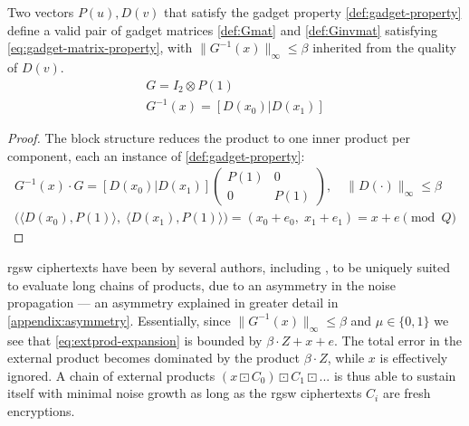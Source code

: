 \vspace{1pt}

\begin{lemma}
    \label{lemma:gadget-matrix-construction}
    Two vectors $P(u), D(v)$ that satisfy the gadget property \eqref{def:gadget-property} define a valid pair of gadget matrices \eqref{def:Gmat} and \eqref{def:Ginvmat} satisfying \eqref{eq:gadget-matrix-property}, with $\|G^{-1}(x)\|_\infty \leq \beta$ inherited from the quality of $D(v)$.
    \begin{gather}
        \label{def:Gmat}
        G = I_2 \otimes P(1) \\
        \label{def:Ginvmat}
        G^{-1}(x) = [D(x_0)|D(x_1)]
    \end{gather}

    \begin{proof}
        The block structure reduces the product to one inner product per component, each an instance of \eqref{def:gadget-property}:
        \begin{gather*}
            G^{-1}(x)\cdot G = [D(x_0)|D(x_1)]
            \begin{pmatrix}
                P(1) & 0 \\
                0 & P(1)
            \end{pmatrix}, \quad \|D(\cdot)\|_\infty \leq \beta \\
            \big(\langle D(x_0), P(1)\rangle,\; \langle D(x_1), P(1)\rangle\big)
            = (x_0 + e_0,\; x_1 + e_1) = x + e \pmod{Q}
        \end{gather*}
    \end{proof}
\end{lemma}

\begin{remark}%
    \label{rem:extprod-asymmetry} %
    \gls{rgsw} ciphertexts have been by several authors, including \cite{cryptoeprint:2013/541, cryptoeprint:2018/421}, to be uniquely suited to evaluate long chains of products, due to an asymmetry in the noise propagation --- an asymmetry explained in greater detail in \cref{appendix:asymmetry}. Essentially, since $\|G^{-1}(x)\|_\infty \leq \beta$ and $\mu\in\{0,1\}$ we see that \eqref{eq:extprod-expansion} is bounded by $\beta\cdot Z + x + e$. The total error in the external product becomes dominated by the product $\beta \cdot Z$, while $x$ is effectively ignored. A chain of external products $(x\boxdot C_0) \boxdot C_1 \boxdot ...$ is thus able to sustain itself with minimal noise growth as long as the \gls{rgsw} ciphertexts $C_i$ are fresh encryptions.
\end{remark}

